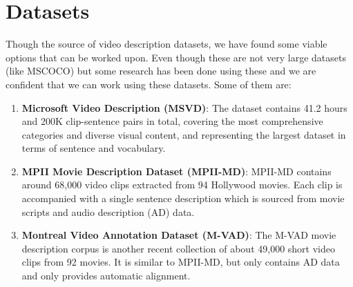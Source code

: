 \documentclass{article}
\begin{document}
	\section{Datasets}
		Though the source of video description datasets, we have found some viable options that can be worked upon. Even though these are not very large datasets (like MSCOCO) but some research has been done using these and we are confident that we can work using these datasets. Some of them are:
		\begin{enumerate}
		\item
			\textbf{Microsoft Video Description (MSVD)}: The dataset contains 41.2 hours and 200K clip-sentence pairs in total, covering the most comprehensive categories and diverse visual content, and representing the largest dataset in terms of sentence and vocabulary.
		\item
			\textbf{MPII Movie Description Dataset (MPII-MD)}: MPII-MD contains around 68,000 video clips extracted from 94 Hollywood movies. Each clip is accompanied with a single sentence description which is sourced from movie scripts and audio description (AD) data.
		\item
			\textbf{Montreal Video Annotation Dataset (M-VAD)}: The M-VAD movie description corpus is another recent collection of about 49,000 short video clips from 92 movies. It is similar to MPII-MD, but only contains AD data and only provides automatic alignment. 
		\end{enumerate}
\end{document}
